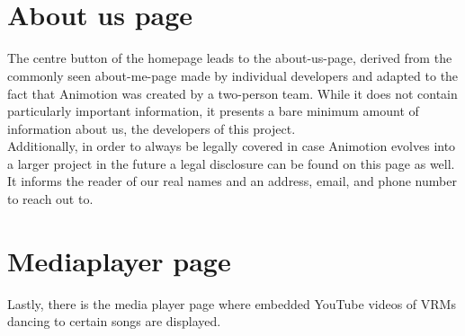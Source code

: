 \\
\\
\section{About us page}
The centre button of the homepage leads to the about-us-page, derived from the commonly seen about-me-page
made by individual developers and adapted to the fact that Animotion was created by a two-person team. While
it does not contain particularly important information, it presents a bare minimum amount of information
about us, the developers of this project. \\
Additionally, in order to always be legally covered in case Animotion evolves into a larger project in the
future a legal disclosure can be found on this page as well. It informs the reader of our real names and an
address, email, and phone number to reach out to. \\
\section{Mediaplayer page}
Lastly, there is the media player page where embedded YouTube videos of VRMs dancing to certain songs are displayed. \\

